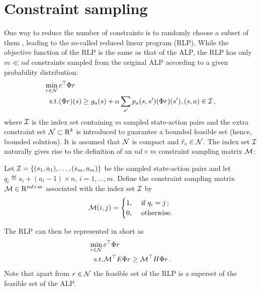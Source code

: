 \section{Constraint sampling}
One way to reduce the number of constraints is to randomly choose a subset of them \cite{CS},
leading to the so-called reduced linear program (RLP). 
While the objective function of the RLP is the same as that of the ALP, 
the RLP has only $m \ll nd$ constraints sampled from the original ALP according to a given probability distribution:
\begin{align}\label{rlp}
\begin{split}
\min_{r\in \N}\, &c^\top \Phi r\\
\text{s.t.}\mb &(\Phi r)(s)\geq g_a(s)+\alpha\sum_{s'}p_a(s,s')(\Phi r)(s'), \mb (s,a) \in \I\,,
\end{split}
\end{align}
where $\mathcal{I}$ is the index set containing $m$ sampled state-action pairs and
the extra constraint set $\mathcal{N}\subset \mathrm{R}^k$ is introduced to guarantee a bounded feasible set (hence, bounded solution).
It is assumed that $\mathcal{N}$ is compact and $\tilde{r}_c\in \mathcal{N}$. 
The index set $\mathcal{I}$ naturally gives rise to the definition of an $nd\times m$ constraint sampling matrix $\mathcal{M}$:
\begin{definition}\label{csampmat}
Let $\mathcal{I}=\{(s_1,a_1),\ldots,(s_m,a_m)\}$ be the sampled state-action pairs and let $q_i \eqdef s_i+(a_i-1)\times n$, $i=1,\ldots,m$. Define the constraint sampling matrix $\mathcal{M} \in \mathrm{R}^{nd\times m}$ associated with the index set $\mathcal{I}$ by
\begin{align}
\mathcal{M}(i,j)
=
\begin{cases}
1, & \text{ if } q_i = j\,;\\
0, & \text{ otherwise}.
\end{cases}
\end{align}
\end{definition}
The RLP can then be represented in short as
\begin{align}\label{rlpshort}
\begin{split}
\min_{r\in \N}\, &c^\top \Phi r\\
\text{s.t.}\mb & \M^\top E \Phi r \geq \M^\top H \Phi r\,.
\end{split}
\end{align}
Note that apart from $r\in \mathcal{N}$ the feasible set of the RLP is a superset of the feasible set of the ALP.

